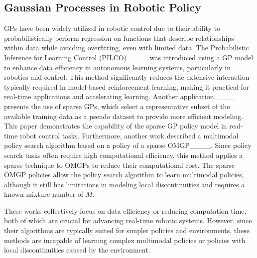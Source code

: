 \subsection{Gaussian Processes in Robotic Policy}
GPs have been widely utilized in robotic control due to their ability to probabilistically perform regression on functions that describe relationships within data while avoiding overfitting, even with limited data.
The Probabilistic Inference for Learning Control (PILCO)____ was introduced using a GP model to enhance data efficiency in autonomous learning systems, particularly in robotics and control.
This method significantly reduces the extensive interaction typically required in model-based reinforcement learning, making it practical for real-time applications and accelerating learning.
Another application____ presents the use of sparse GPs, which select a representative subset of the available training data as a pseudo dataset to provide more efficient modeling. This paper demonstrates the capability of the sparse GP policy model in real-time robot control tasks. 
Furthermore, another work described a multimodal policy search algorithm based on a policy of a sparse OMGP____. Since policy search tasks often require high computational efficiency, this method applies a sparse technique to OMGPs to reduce their computational cost. The sparse OMGP policies allow the policy search algorithm to learn multimodal policies, although it still has limitations in modeling local discontinuities and requires a known mixture number of $M$.


These works collectively focus on data efficiency or reducing computation time, both of which are crucial for advancing real-time robotic systems.
However, since their algorithms are typically suited for simpler policies and environments, these methods are incapable of learning complex multimodal policies or policies with local discontinuities caused by the environment.



